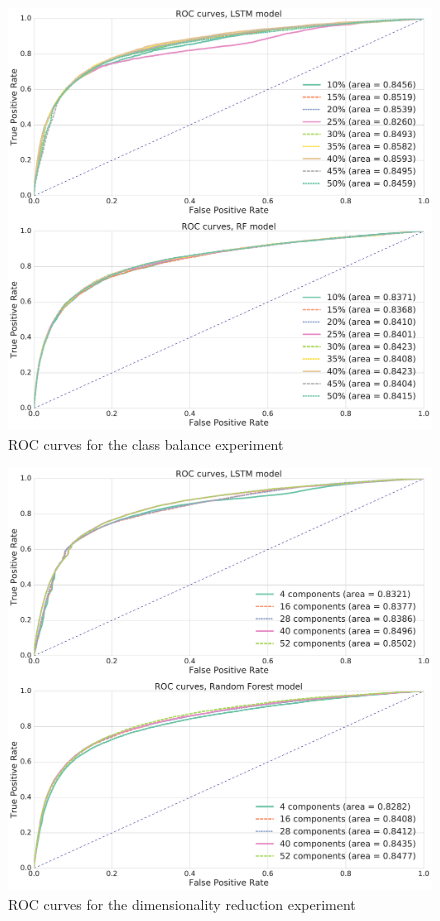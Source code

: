 \documentclass{kththesis}
\begin{document}
\begin{figure}[h]
    \centering
    \includegraphics[width=1.0\textwidth,keepaspectratio]{figures/roc_class_balance.pdf}
    \caption{ROC curves for the class balance experiment}
    \label{fig:roc_class_balance}
\end{figure}

\begin{figure}
    \centering
    \includegraphics[width=1.0\textwidth,keepaspectratio]{figures/roc_dim_reduction.pdf}
    \caption{ROC curves for the dimensionality reduction experiment}
    \label{fig:roc_dim_reduction}
\end{figure}
\end{document}
